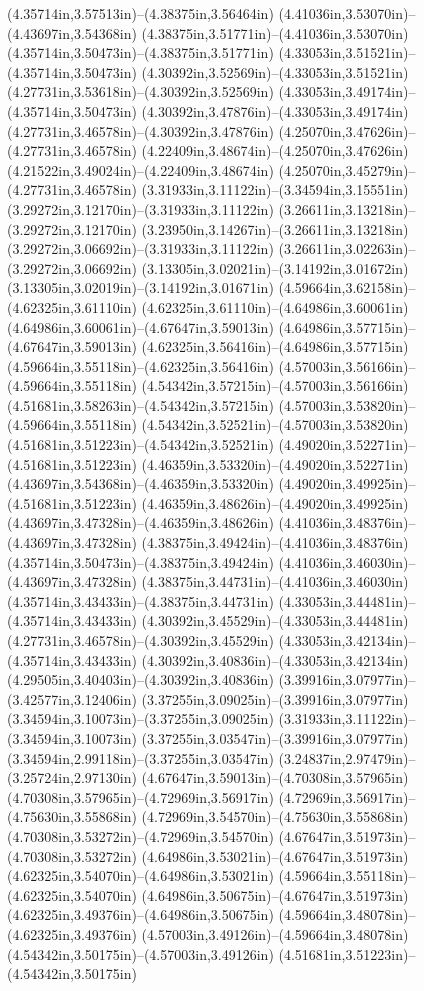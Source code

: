 (4.35714in,3.57513in)--(4.38375in,3.56464in) (4.41036in,3.53070in)--(4.43697in,3.54368in) (4.38375in,3.51771in)--(4.41036in,3.53070in) (4.35714in,3.50473in)--(4.38375in,3.51771in) (4.33053in,3.51521in)--(4.35714in,3.50473in) (4.30392in,3.52569in)--(4.33053in,3.51521in) (4.27731in,3.53618in)--(4.30392in,3.52569in) (4.33053in,3.49174in)--(4.35714in,3.50473in) (4.30392in,3.47876in)--(4.33053in,3.49174in) (4.27731in,3.46578in)--(4.30392in,3.47876in) (4.25070in,3.47626in)--(4.27731in,3.46578in) (4.22409in,3.48674in)--(4.25070in,3.47626in) (4.21522in,3.49024in)--(4.22409in,3.48674in) (4.25070in,3.45279in)--(4.27731in,3.46578in) (3.31933in,3.11122in)--(3.34594in,3.15551in) (3.29272in,3.12170in)--(3.31933in,3.11122in) (3.26611in,3.13218in)--(3.29272in,3.12170in) (3.23950in,3.14267in)--(3.26611in,3.13218in) (3.29272in,3.06692in)--(3.31933in,3.11122in) (3.26611in,3.02263in)--(3.29272in,3.06692in) (3.13305in,3.02021in)--(3.14192in,3.01672in) (3.13305in,3.02019in)--(3.14192in,3.01671in) (4.59664in,3.62158in)--(4.62325in,3.61110in) (4.62325in,3.61110in)--(4.64986in,3.60061in) (4.64986in,3.60061in)--(4.67647in,3.59013in) (4.64986in,3.57715in)--(4.67647in,3.59013in) (4.62325in,3.56416in)--(4.64986in,3.57715in) (4.59664in,3.55118in)--(4.62325in,3.56416in) (4.57003in,3.56166in)--(4.59664in,3.55118in) (4.54342in,3.57215in)--(4.57003in,3.56166in) (4.51681in,3.58263in)--(4.54342in,3.57215in) (4.57003in,3.53820in)--(4.59664in,3.55118in) (4.54342in,3.52521in)--(4.57003in,3.53820in) (4.51681in,3.51223in)--(4.54342in,3.52521in) (4.49020in,3.52271in)--(4.51681in,3.51223in) (4.46359in,3.53320in)--(4.49020in,3.52271in) (4.43697in,3.54368in)--(4.46359in,3.53320in) (4.49020in,3.49925in)--(4.51681in,3.51223in) (4.46359in,3.48626in)--(4.49020in,3.49925in) (4.43697in,3.47328in)--(4.46359in,3.48626in) (4.41036in,3.48376in)--(4.43697in,3.47328in) (4.38375in,3.49424in)--(4.41036in,3.48376in) (4.35714in,3.50473in)--(4.38375in,3.49424in) (4.41036in,3.46030in)--(4.43697in,3.47328in) (4.38375in,3.44731in)--(4.41036in,3.46030in) (4.35714in,3.43433in)--(4.38375in,3.44731in) (4.33053in,3.44481in)--(4.35714in,3.43433in) (4.30392in,3.45529in)--(4.33053in,3.44481in) (4.27731in,3.46578in)--(4.30392in,3.45529in) (4.33053in,3.42134in)--(4.35714in,3.43433in) (4.30392in,3.40836in)--(4.33053in,3.42134in) (4.29505in,3.40403in)--(4.30392in,3.40836in) (3.39916in,3.07977in)--(3.42577in,3.12406in) (3.37255in,3.09025in)--(3.39916in,3.07977in) (3.34594in,3.10073in)--(3.37255in,3.09025in) (3.31933in,3.11122in)--(3.34594in,3.10073in) (3.37255in,3.03547in)--(3.39916in,3.07977in) (3.34594in,2.99118in)--(3.37255in,3.03547in) (3.24837in,2.97479in)--(3.25724in,2.97130in) (4.67647in,3.59013in)--(4.70308in,3.57965in) (4.70308in,3.57965in)--(4.72969in,3.56917in) (4.72969in,3.56917in)--(4.75630in,3.55868in) (4.72969in,3.54570in)--(4.75630in,3.55868in) (4.70308in,3.53272in)--(4.72969in,3.54570in) (4.67647in,3.51973in)--(4.70308in,3.53272in) (4.64986in,3.53021in)--(4.67647in,3.51973in) (4.62325in,3.54070in)--(4.64986in,3.53021in) (4.59664in,3.55118in)--(4.62325in,3.54070in) (4.64986in,3.50675in)--(4.67647in,3.51973in) (4.62325in,3.49376in)--(4.64986in,3.50675in) (4.59664in,3.48078in)--(4.62325in,3.49376in) (4.57003in,3.49126in)--(4.59664in,3.48078in) (4.54342in,3.50175in)--(4.57003in,3.49126in) (4.51681in,3.51223in)--(4.54342in,3.50175in) 